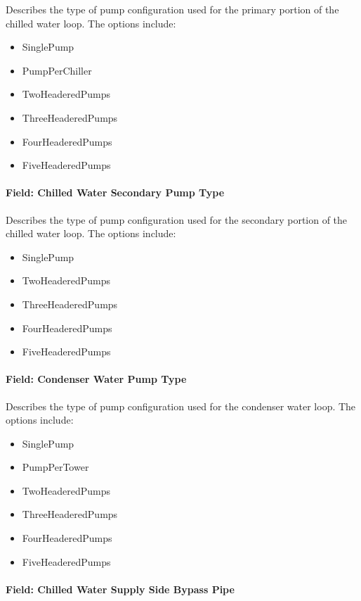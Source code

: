 Describes the type of pump configuration used for the primary portion of the chilled water loop. The options include:

\begin{itemize}
\item
  SinglePump
\item
  PumpPerChiller
\item
  TwoHeaderedPumps
\item
  ThreeHeaderedPumps
\item
  FourHeaderedPumps
\item
  FiveHeaderedPumps
\end{itemize}

\paragraph{Field: Chilled Water Secondary Pump Type}\label{field-chilled-water-secondary-pump-type}

Describes the type of pump configuration used for the secondary portion of the chilled water loop. The options include:

\begin{itemize}
\item
  SinglePump
\item
  TwoHeaderedPumps
\item
  ThreeHeaderedPumps
\item
  FourHeaderedPumps
\item
  FiveHeaderedPumps
\end{itemize}

\paragraph{Field: Condenser Water Pump Type}\label{field-condenser-water-pump-type}

Describes the type of pump configuration used for the condenser water loop. The options include:

\begin{itemize}
\item
  SinglePump
\item
  PumpPerTower
\item
  TwoHeaderedPumps
\item
  ThreeHeaderedPumps
\item
  FourHeaderedPumps
\item
  FiveHeaderedPumps
\end{itemize}

\paragraph{Field: Chilled Water Supply Side Bypass Pipe}\label{field-chilled-water-supply-side-bypass-pipe}

